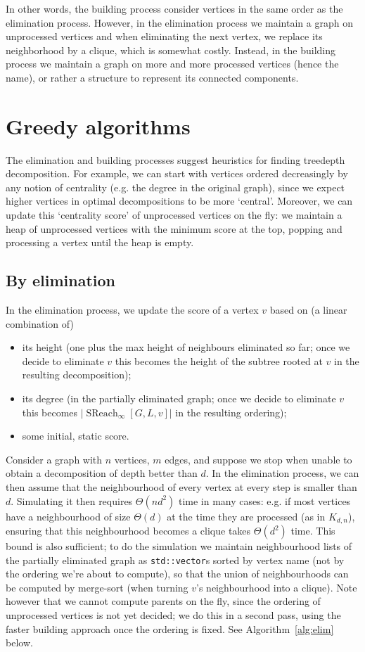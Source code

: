 \documentclass{timgad}
\DeclareMathOperator{\SReach}{SReach}
\begin{document}
In other words, the building process consider vertices in the same order as the elimination process.
However, in the elimination process we maintain a graph on unprocessed vertices and when eliminating the next vertex, we replace its neighborhood by a clique, which is somewhat costly.
Instead, in the building process we maintain a graph on more and more processed vertices (hence the name), or rather a structure to represent its connected components.

\section{Greedy algorithms}
The elimination and building processes suggest heuristics for finding treedepth decomposition.
For example, we can start with vertices ordered decreasingly by any notion of centrality (e.g. the degree in the original graph), since we expect higher vertices in optimal decompositions to be more `central'.
Moreover, we can update this `centrality score' of unprocessed vertices on the fly: we maintain a heap of unprocessed vertices with the minimum score at the top, popping and processing a vertex until the heap is empty.
\subsection{By elimination}
In the elimination process, we update the score of a vertex $v$ based on (a linear combination of) 
\begin{itemize}
\item its height (one plus the max height of neighbours eliminated so far; once we decide to eliminate $v$ this becomes the height of the subtree rooted at $v$ in the resulting decomposition);
\item its degree (in the partially eliminated graph; once we decide to eliminate $v$ this becomes $|\SReach_{\infty}[G,L,v]|$ in the resulting ordering);
\item some initial, static score.
\end{itemize} 

Consider a graph with $n$ vertices, $m$ edges, and suppose we stop when unable to obtain a decomposition of depth better than $d$.
In the elimination process, we can then assume that the neighbourhood of every vertex at every step is smaller than $d$.
Simulating it then requires $\Theta(nd^2)$ time in many cases: e.g. if most vertices have a neighbourhood of size $\Theta(d)$ at the time they are processed (as in $K_{d,n}$), ensuring that this neighbourhood becomes a clique takes $\Theta(d^2)$ time.
This bound is also sufficient; to do the simulation we maintain neighbourhood lists of the partially eliminated graph
as \texttt{std::vector}s sorted by vertex name (not by the ordering we're about to compute), so that the union of neighbourhoods can be computed by merge-sort (when turning $v$'s neighbourhood into a clique).
Note however that we cannot compute parents on the fly, since the ordering of unprocessed vertices is not yet decided;
we do this in a second pass, using the faster building approach once the ordering is fixed.
See Algorithm~\ref{alg:elim} below.
\end{document}
